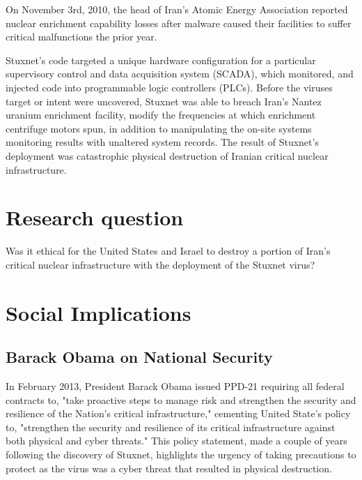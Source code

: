 \documentclass[12pt]{article}
\begin{document}
\begin{multicols}{2}
On November 3rd, 2010, the head of Iran's Atomic Energy Association reported nuclear enrichment capability losses after malware caused their facilities to suffer critical malfunctions the prior year.\cite{didStuxnetTakeOut1000Centrifuges} 

Stuxnet's code targeted a unique hardware configuration for a particular supervisory control and data acquisition system (SCADA), which monitored, and injected code into programmable logic controllers (PLCs). Before the viruses target or intent were uncovered, Stuxnet was able to breach Iran's Nantez uranium enrichment facility, modify the frequencies at which enrichment centrifuge motors spun, in addition to manipulating the on-site systems monitoring results with unaltered system records. The result of Stuxnet's deployment was catastrophic physical destruction of Iranian critical nuclear infrastructure.\cite{w32.stuxnetDossier}\cite{lessonsFromStuxnet}


\section{Research question}

Was it ethical for the United States and Israel to destroy a portion of Iran's critical nuclear infrastructure with the deployment of the Stuxnet virus?

\section{Social Implications}

\subsection{Barack Obama on National Security}

In February 2013, President Barack Obama issued PPD-21 requiring all federal contracts to, "take proactive steps to manage risk and strengthen the security and resilience of the Nation’s critical infrastructure," cementing United State's policy to, "strengthen the security and resilience of its critical infrastructure against both physical and cyber threats."\cite{industrialCyberVulnerabilities} This policy statement, made a couple of years following the discovery of Stuxnet, highlights the urgency of taking precautions to protect as the virus was a cyber threat that resulted in physical destruction.


\end{multicols}
\end{document}
